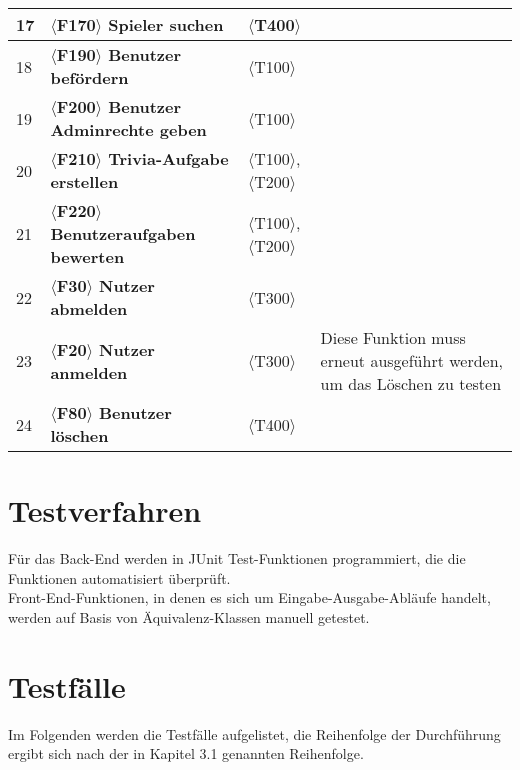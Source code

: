\begin{center}
\begin{longtable}{|m{}|m{}|m{}|m{}|}
		\hline
		17  & \textbf{$\langle$F170$\rangle$ Spieler suchen } &  $\langle$T400$\rangle$   &    \\ 
		\hline
		18  & \textbf{$\langle$F190$\rangle$ Benutzer befördern } &  $\langle$T100$\rangle$   &     \\ 
		\hline
		19  & \textbf{$\langle$F200$\rangle$ Benutzer Adminrechte geben } &  $\langle$T100$\rangle$   &    \\ 
		\hline
		20  & \textbf{$\langle$F210$\rangle$ Trivia-Aufgabe erstellen } &  $\langle$T100$\rangle$, $\langle$T200$\rangle$   &     \\ 
		\hline
		21  & \textbf{$\langle$F220$\rangle$ Benutzeraufgaben bewerten } &  $\langle$T100$\rangle$, $\langle$T200$\rangle$   &    \\ 
		\hline
		22  & \textbf{$\langle$F30$\rangle$ Nutzer abmelden } &  $\langle$T300$\rangle$   &     \\ 
		\hline
		23 & \textbf{$\langle$F20$\rangle$ Nutzer anmelden } &  $\langle$T300$\rangle$   &   Diese Funktion muss erneut ausgeführt werden, um das Löschen zu testen \\ 
		\hline
		24 & \textbf{$\langle$F80$\rangle$ Benutzer löschen } &  $\langle$T400$\rangle$   &     \\ 
		\hline
	\end{longtable}
\end{center}

\section{Testverfahren}

Für das Back-End werden in JUnit Test-Funktionen programmiert, die die Funktionen automatisiert überprüft.\\
Front-End-Funktionen, in denen es sich um Eingabe-Ausgabe-Abläufe handelt, werden auf Basis von Äquivalenz-Klassen manuell getestet.  


\section{Testfälle}

Im Folgenden werden die Testfälle aufgelistet, die Reihenfolge der Durchführung ergibt sich nach der in Kapitel 3.1 genannten Reihenfolge.

